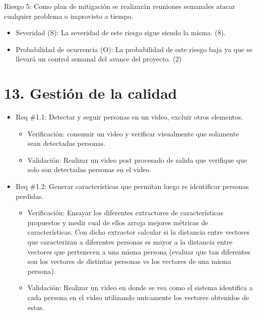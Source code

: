 \documentclass[11pt]{charter}
\begin{document}
Riesgo 5: Como plan de mitigación se realizarán reuniones semanales atacar cualquier problema o improvisto a tiempo.
\begin{itemize}
\item Severidad (S): La severidad de este riesgo sigue siendo la misma. (8).
\item Probabilidad de ocurrencia (O): La probabilidad de este riesgo baja ya que se llevará un control semanal del avance del proyecto. (2)
\end{itemize}
 
\newpage
 
\section{13. Gestión de la calidad}
\label{sec:calidad}

\begin{itemize} 
\item Req \#1.1: Detectar y seguir personas en un video, excluir otros elementos.
\begin{itemize}
\item Verificación: consumir un video y verificar visualmente que solamente sean detectadas personas. 
\item Validación: Realizar un video post procesado de salida que verifique que solo son detectadas personas en el video.  
\end{itemize}
\end{itemize}

\begin{itemize} 
\item Req \#1.2: Generar características que permitan luego re identificar personas perdidas.
\begin{itemize}
\item Verificación: Ensayar los diferentes extractores de características propuestos y medir cual de ellos arroja mejores métricas de características. Con dicho extractor calcular si la distancia entre vectores que caracterizan a diferentes personas es mayor a la distancia entre vectores que pertenecen a una misma persona (evaluar que tan diferentes son los vectores de distintas personas vs los vectores de una misma persona).
\item Validación: Realizar un video en donde se vea como el sistema identifica a cada persona en el video utilizando unicamente los vectores obtenidos de estas.
\end{itemize}
\end{itemize}
\end{document}
